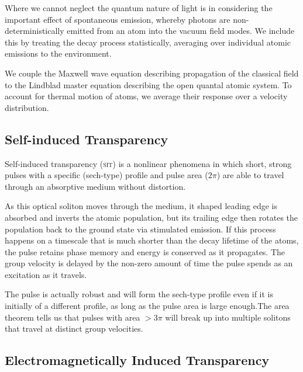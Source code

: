     Where we cannot neglect the quantum nature of light is in considering the
    important effect of spontaneous emission, whereby photons are non-
    deterministically emitted from an atom into the vacuum field modes. We
    include this by treating the decay process statistically, averaging over
    individual atomic emissions to the environment.\cite{loudon2000quantum}

    We couple the Maxwell wave equation describing propagation of the classical
    field to the Lindblad master equation describing the open quantal atomic
    system. To account for thermal motion of atoms, we average their response
    over a velocity distribution.\cite{foot2005atomic}


  \subsection*{Self-induced Transparency}

    Self-induced transparency (\textsc{sit}) is a nonlinear phenomena in which
    short, strong pulses with a specific (sech-type) profile and pulse area
    ($2\pi$) are able to travel through an absorptive medium without
    distortion.\cite{McCall1969}

    As this optical soliton moves through the medium, it shaped leading edge is
    absorbed and inverts the atomic population, but its trailing edge then
    rotates the population back to the ground state via stimulated
    emission.\cite{allen1975optical} If this process happens on a timescale that
    is much shorter than the decay lifetime of the atoms, the pulse retains
    phase memory and energy is conserved as it propagates. The group velocity is
    delayed by the non-zero amount of time the pulse spends as an excitation as
    it travels.

    The pulse is actually robust and will form the sech-type profile even if it
    is initially of a different profile, as long as the pulse area is large
    enough.The area theorem\cite{McCall1969} tells us that pulses with area $>
    3\pi$ will break up into multiple solitons that travel at distinct group
    velocities.\cite{Slusher1972}

  \subsection*{Electromagnetically Induced Transparency}

